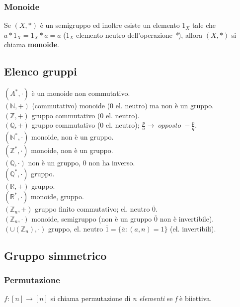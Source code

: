 \subsubsection{Monoide}
Se \((X,*)\) è un semigruppo ed inoltre esiste un elemento \(1_X\) tale che \(a*1_X=1_X*a=a\) (\(1_X\) elemento neutro dell'operazione \textit{*}), allora \((X,*)\) si chiama \textbf{monoide}.

\subsection{Elenco gruppi}
\textbf{\((A^*, \cdot )\)} è un monoide non commutativo.
\\\textbf{\((\mathbb{N}, +) \)} (commutativo) monoide (0 el. neutro) ma non è un gruppo.
\\\textbf{\( (\mathbb{Z}, +)\)} gruppo commutativo (0 el. neutro).
\\\textbf{\((\mathbb{Q}, +) \)} gruppo commutativo (0 el. neutro); \(\frac{p}{a}\rightarrow\;opposto\;-\frac{p}{q}\).
\\\textbf{\((\mathbb{N}^*, \cdot)\)} monoide, non è un gruppo.
\\\textbf{\((\mathbb{Z}^*, \cdot)\)} monoide, non è un gruppo.
\\\textbf{\((\mathbb{Q}, \cdot)\)} non è un gruppo, 0 non ha inverso.
\\\textbf{\((\mathbb{Q}^*,\cdot)\)} gruppo.
\\\textbf{\((\mathbb{R}, +)\)} gruppo.
\\\textbf{\((\mathbb{R}^*, \cdot)\)} monoide, gruppo.
\\\textbf{\((\mathbb{Z}_n, +)\)} gruppo finito commutativo; el. neutro \(\overline{0}\).
\\\textbf{\((\mathbb{Z}_n,\cdot)\)} monoide, semigruppo (non è un gruppo \(\overline{0}\) non è invertibile).
\\\textbf{\((\cup (\mathbb{Z}_n),\cdot) \)} gruppo, el. neutro \(\overline{1}=\{\overline{a}: (a,n)=1\}\) (el. invertibili).

\subsection{Gruppo simmetrico}

\subsubsection{Permutazione}
\(f:[n]\rightarrow [n]\) si chiama permutazione di \textit{n elementi} se \textit{f} è biiettiva.

